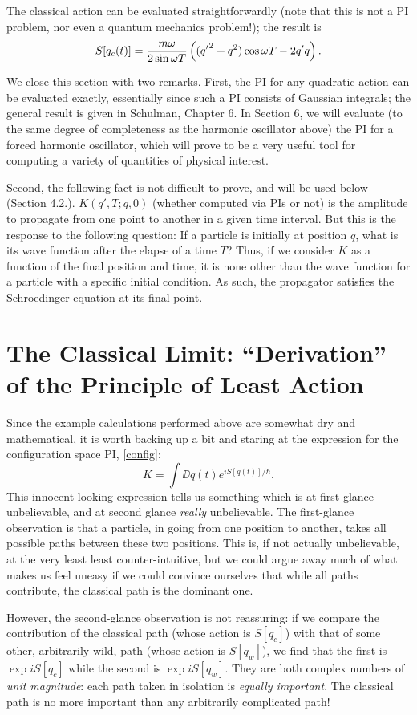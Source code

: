 \documentclass[12pt]{article}
\begin{document}
The classical action can be evaluated straightforwardly (note that this
is not a PI problem, nor even a quantum mechanics problem!);
the result is
\[ S[q_c(t)]={m{\omega}\over2\sin{\omega} T}
\left(({q'}^2+q^2)\cos{\omega} T-2q'q\right).\]

We close this section with two remarks. First,
the PI for any quadratic action
can be evaluated exactly, essentially since such a PI consists of
Gaussian integrals; the general result is given in Schulman, Chapter 6.
In Section 6, we will evaluate (to the same degree of completeness as
the harmonic oscillator above) the PI for a forced harmonic
oscillator, which will prove to be a very useful tool for computing a
variety of quantities of physical interest.

Second, the following fact is not difficult to prove, and will be used
below (Section 4.2.). $K(q',T;q,0)$ (whether computed via PIs or not)
is the amplitude to propagate from
one point to another in a given time interval. But this is the
response to the following question: If a particle is initially at
position $q$, what is its wave function after the elapse of a time
$T$? Thus, if we consider $K$ as a
function of the final position and time, it is none other than the
wave function for a particle with a specific initial condition. As
such, the propagator satisfies the Schroedinger equation at its final
point.


\section[Classical Limit]
{The Classical Limit: ``Derivation'' of the Principle of Least Action}

Since the example calculations performed above are somewhat dry and
mathematical, it is worth backing up a bit and staring at the
expression for the configuration space PI, \eqref{config}:
\[ K=\int\DD q(t) e^{i S[q(t)]/\hbar}.
\]
This innocent-looking expression tells us something which is at first
glance unbelievable, and at second glance {\em really} unbelievable.
The first-glance observation is that a particle, in going from one
position to another, takes all possible paths between these two
positions. This is, if not actually unbelievable, at the very least
least counter-intuitive, but we could argue away much of what makes us
feel uneasy if we could convince ourselves that while all paths
contribute, the classical path is the dominant one. 

However, the second-glance observation is not reassuring: if we
compare the contribution of the classical path (whose action is
$S[q_c]$) with that of some other, arbitrarily wild, path (whose
action is $S[q_w]$), we find that the first is $\exp iS[q_c]$ while
the second is $\exp iS[q_w]$. They are both complex numbers of {\em
unit magnitude}: each path taken in isolation is {\em equally
important}. The classical path is no more important than any
arbitrarily complicated path!
\end{document}
